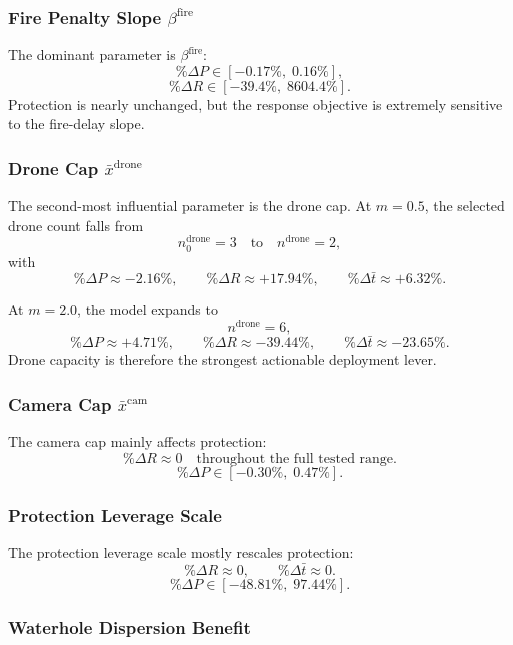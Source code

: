\subsubsection{Fire Penalty Slope \texorpdfstring{$\beta^{\mathrm{fire}}$}{beta fire}}

The dominant parameter is $\beta^{\mathrm{fire}}$:
\[
\%\Delta P \in [-0.17\%,\;0.16\%],
\]
\[
\%\Delta R \in [-39.4\%,\;8604.4\%].
\]
Protection is nearly unchanged, but the response objective is extremely sensitive to the fire-delay slope.

\subsubsection{Drone Cap \texorpdfstring{$\bar{x}^{\mathrm{drone}}$}{drone cap}}

The second-most influential parameter is the drone cap. At $m=0.5$, the selected drone count falls from
\[
n^{\mathrm{drone}}_0 = 3
\quad\text{to}\quad
n^{\mathrm{drone}} = 2,
\]
with
\[
\%\Delta P \approx -2.16\%,
\qquad
\%\Delta R \approx +17.94\%,
\qquad
\%\Delta \bar{t} \approx +6.32\%.
\]

At $m=2.0$, the model expands to
\[
n^{\mathrm{drone}} = 6,
\]
\[
\%\Delta P \approx +4.71\%,
\qquad
\%\Delta R \approx -39.44\%,
\qquad
\%\Delta \bar{t} \approx -23.65\%.
\]
Drone capacity is therefore the strongest actionable deployment lever.

\subsubsection{Camera Cap \texorpdfstring{$\bar{x}^{\mathrm{cam}}$}{camera cap}}

The camera cap mainly affects protection:
\[
\%\Delta R \approx 0
\quad\text{throughout the full tested range.}
\]
\[
\%\Delta P \in [-0.30\%,\;0.47\%].
\]

\subsubsection{Protection Leverage Scale}

The protection leverage scale mostly rescales protection:
\[
\%\Delta R \approx 0,
\qquad
\%\Delta \bar{t} \approx 0.
\]
\[
\%\Delta P \in [-48.81\%,\;97.44\%].
\]

\subsubsection{Waterhole Dispersion Benefit}

